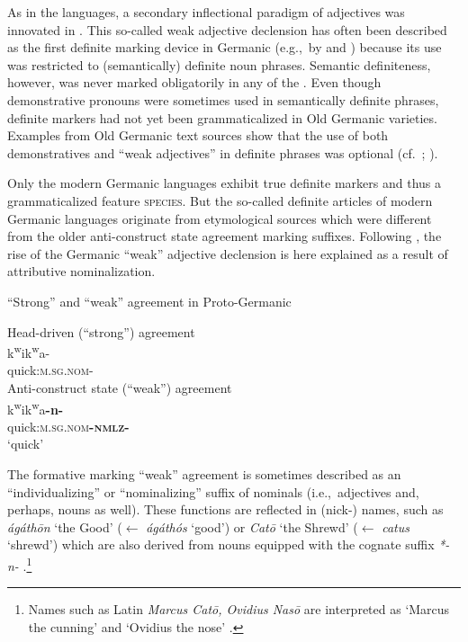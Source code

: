 As in the  languages, a secondary inflectional paradigm of adjectives was innovated in . This so-called weak adjective declension has often been described as the first definite marking device in Germanic (e.g.,~by \citealt{heinrichs1954} and \citealt[170]{ringe2006}) because its use was restricted to (semantically) definite noun phrases. Semantic definiteness, however, was never marked obligatorily in any of the . Even though demonstrative pronouns were sometimes used in semantically definite phrases, definite markers had not yet been grammaticalized in Old Germanic varieties. Examples from Old Germanic text sources show that the use of both demonstratives and “weak adjectives” in definite phrases was optional (cf.~\citealt{philippi1997}; \citealt{heinrichs1954}).

Only the modern Germanic languages exhibit true definite markers and thus a grammaticalized feature \textsc{species}. But the so-called definite articles of modern Germanic languages originate from etymological sources which were different from the older anti\hyp{}construct state agreement marking suffixes. Following \citet[267–268]{riesler2006a}, the rise of the Germanic “weak” adjective declension is here explained as a result of attributive nominalization. 
\begin{exe}
\ex \rm{“Strong” and “weak” agreement in Proto\hyp{}Germanic \citep[169]{ringe2006}}
\begin{xlist}
\ex \rm{Head\hyp{}driven (“strong”) agreement}\\
\gll *k\textsuperscript{w}ik\textsuperscript{w}a-\\
	quick:\textsc{m.sg.nom-}\\
\ex \rm{Anti\hyp{}construct state (“weak”) agreement}\\
\gll *k\textsuperscript{w}ik\textsuperscript{w}a\textbf{-n-}\\
	quick:\textsc{m.sg.nom}\textbf{\textsc{-nmlz-}}\\
\glt	‘quick’
\end{xlist}
\end{exe}
The  formative marking “weak” agreement is sometimes described as an “individualizing” or “nominalizing” suffix of nominals (i.e.,~adjectives and, perhaps, nouns as well). These functions are reflected in (nick-) names, such as  \textit{ágáthōn} ‘the Good’ ($\leftarrow$ \textit{ágáthós} ‘good’) or  \textit{Catō} ‘the Shrewd’ ($\leftarrow$ \textit{catus} ‘shrewd’) which are also derived from nouns equipped with the cognate suffix \textit{*-n-} \citep[170]{ringe2006}.\footnote{Names such as Latin \textit{Marcus Catō, Ovidius Nasō} are interpreted as ‘Marcus the cunning’ and ‘Ovidius the nose’ \citep[6–7]{nocentini1996}.}

